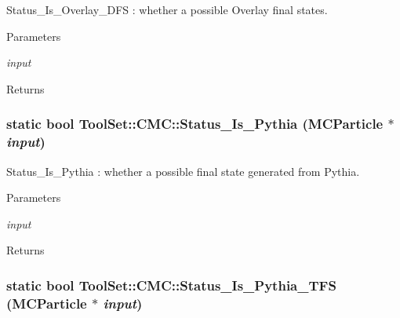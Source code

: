 Status\_\-Is\_\-Overlay\_\-DFS : whether a possible Overlay final states. 
\begin{DoxyParams}{Parameters}
\item[{\em input}]\end{DoxyParams}
\begin{DoxyReturn}{Returns}

\end{DoxyReturn}
\hypertarget{classToolSet_1_1CMC_a3fbb915477cbbdca4193b8b2ff8cd356}{
\subsubsection[{Status\_\-Is\_\-Pythia}]{\setlength{\rightskip}{0pt plus 5cm}static bool ToolSet::CMC::Status\_\-Is\_\-Pythia (MCParticle $\ast$ {\em input})}}
\label{classToolSet_1_1CMC_a3fbb915477cbbdca4193b8b2ff8cd356}


Status\_\-Is\_\-Pythia : whether a possible final state generated from Pythia. 
\begin{DoxyParams}{Parameters}
\item[{\em input}]\end{DoxyParams}
\begin{DoxyReturn}{Returns}

\end{DoxyReturn}
\hypertarget{classToolSet_1_1CMC_aef5a206838a69936e98ea22a1c36e143}{
\subsubsection[{Status\_\-Is\_\-Pythia\_\-TFS}]{\setlength{\rightskip}{0pt plus 5cm}static bool ToolSet::CMC::Status\_\-Is\_\-Pythia\_\-TFS (MCParticle $\ast$ {\em input})}}
\label{classToolSet_1_1CMC_aef5a206838a69936e98ea22a1c36e143}


